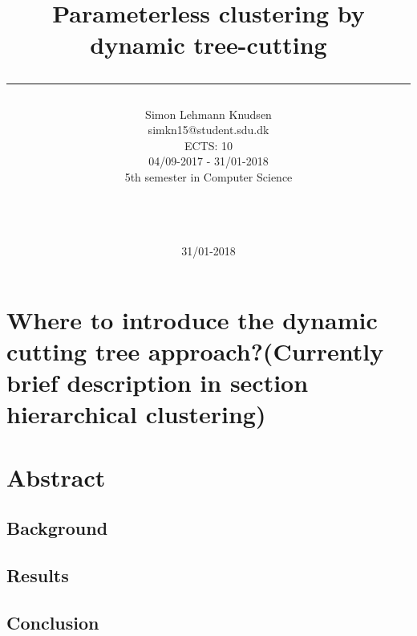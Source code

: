 \documentclass[a4paper,10pt]{article}
\title{ Parameterless clustering by dynamic tree-cutting \rule{10cm}{0.5mm}}
\author{Simon Lehmann Knudsen \\
	simkn15@student.sdu.dk \\
	ECTS: 10 \\
	04/09-2017 - 31/01-2018 \\
	5th semester in Computer Science
\\\rule{5.5cm}{0.5mm}\\}
\date{31/01-2018}
\theoremstyle{plain}
\theoremstyle{definition}
\begin{document}
\maketitle

\newpage
\tableofcontents

\section{Where to introduce the dynamic cutting tree approach?(Currently brief description in section hierarchical clustering)}

\newpage
\section{Abstract}

\subsection{Background}

\subsection{Results}

\subsection{Conclusion}
\end{document}
